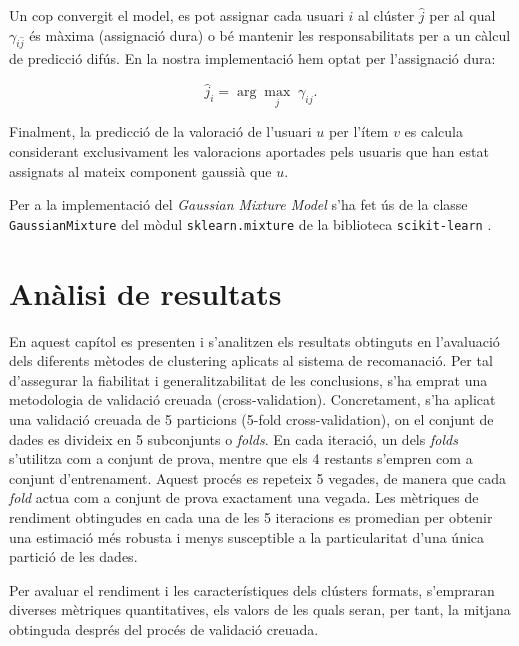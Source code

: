 \documentclass[a4paper,12pt]{report}
\begin{document}
Un cop convergit el model, es pot assignar cada usuari $i$ al clúster $\hat{j}$ per al qual $\gamma_{i\hat{j}}$ és màxima (assignació dura) o bé mantenir les responsabilitats per a un càlcul de predicció difús. En la nostra implementació hem optat per l’assignació dura:

\[
\hat{j}_i = \arg\max_{j} \;\gamma_{ij}.
\]

Finalment, la predicció de la valoració de l’usuari $u$ per l’ítem $v$ es calcula considerant exclusivament les valoracions aportades pels usuaris que han estat assignats al mateix component gaussià que $u$.

Per a la implementació del \emph{Gaussian Mixture Model} s'ha fet ús de la classe \texttt{GaussianMixture} del mòdul \texttt{sklearn.mixture} de la biblioteca \texttt{scikit-learn} \cite{pedregosa2011scikit}.

\chapter{Anàlisi de resultats}

En aquest capítol es presenten i s'analitzen els resultats obtinguts en l'avaluació dels diferents mètodes de clustering aplicats al sistema de recomanació. Per tal d'assegurar la fiabilitat i generalitzabilitat de les conclusions, s'ha emprat una metodologia de validació creuada (cross-validation). Concretament, s'ha aplicat una validació creuada de 5 particions (5-fold cross-validation), on el conjunt de dades es divideix en 5 subconjunts o \textit{folds}. En cada iteració, un dels \textit{folds} s'utilitza com a conjunt de prova, mentre que els 4 restants s'empren com a conjunt d'entrenament. Aquest procés es repeteix 5 vegades, de manera que cada \textit{fold} actua com a conjunt de prova exactament una vegada. Les mètriques de rendiment obtingudes en cada una de les 5 iteracions es promedian per obtenir una estimació més robusta i menys susceptible a la particularitat d'una única partició de les dades.

Per avaluar el rendiment i les característiques dels clústers formats, s'empraran diverses mètriques quantitatives, els valors de les quals seran, per tant, la mitjana obtinguda després del procés de validació creuada.
\end{document}

